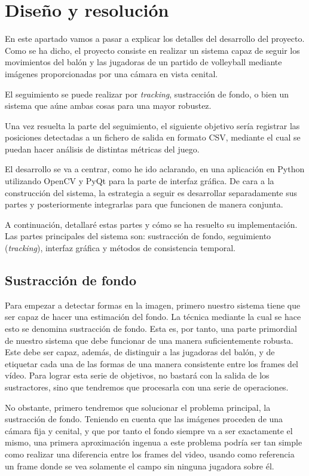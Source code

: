 \section{Diseño y resolución}

En este apartado vamos a pasar a explicar los detalles del desarrollo del proyecto. Como se ha dicho, el proyecto consiste en realizar un sistema capaz de seguir los movimientos del balón y las jugadoras de un partido de volleyball mediante imágenes proporcionadas por una cámara en vista cenital.

El seguimiento se puede realizar por \textit{tracking}, sustracción de fondo, o bien un sistema que aúne ambas cosas para una mayor robustez.

Una vez resuelta la parte del seguimiento, el siguiente objetivo sería registrar las posiciones detectadas a un fichero de salida en formato CSV, mediante el cual se puedan hacer análisis de distintas métricas del juego.

El desarrollo se va a centrar, como he ido aclarando, en una aplicación en Python utilizando OpenCV y PyQt para la parte de interfaz gráfica. De cara a la construcción del sistema, la estrategia a seguir es desarrollar separadamente sus partes y posteriormente integrarlas para que funcionen de manera conjunta.

A continuación, detallaré estas partes y cómo se ha resuelto su implementación. Las partes principales del sistema son: sustracción de fondo, seguimiento (\textit{tracking}), interfaz gráfica y métodos de consistencia temporal.

\subsection{Sustracción de fondo}
\label{sec:subtractors}
Para empezar a detectar formas en la imagen, primero nuestro sistema tiene que ser capaz de hacer una estimación del fondo. La técnica mediante la cual se hace esto se denomina sustracción de fondo. Esta es, por tanto, una parte primordial de nuestro sistema que debe funcionar de una manera suficientemente robusta. Este debe ser capaz, además, de distinguir a las jugadoras del balón, y de etiquetar cada una de las formas de una manera consistente entre los frames del vídeo. Para lograr esta serie de objetivos, no bastará con la salida de los sustractores, sino que tendremos que procesarla con una serie de operaciones.

No obstante, primero tendremos que solucionar el problema principal, la sustracción de fondo. Teniendo en cuenta que las imágenes proceden de una cámara fija y cenital, y que por tanto el fondo siempre va a ser exactamente el mismo, una primera aproximación ingenua a este problema podría ser tan simple como realizar una diferencia entre los frames del video, usando como referencia un frame donde se vea solamente el campo sin ninguna jugadora sobre él.

